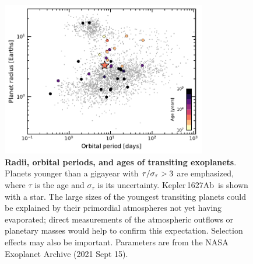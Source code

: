 \documentclass[12pt,modern,twocolumn,tighten]{aastex63}
\newcommand{\pn}{Kepler\,1627Ab} %
\begin{document}
\begin{figure}[tp]
	\begin{center}
		\leavevmode
		\includegraphics[width=0.8\textwidth]{f14.pdf}
	\end{center}
	\vspace{-0.7cm}
	\caption{
    {\bf Radii, orbital periods, and ages of transiting exoplanets}.
    Planets younger than a gigayear with ${\rm \tau}/\sigma_{\tau} >
    3$ are emphasized, where $\tau$ is the age and $\sigma_{\tau}$ is
    its uncertainty.  \pn\ is shown with a star.  The large sizes of
    the youngest transiting planets could be explained by their
    primordial atmospheres not yet having evaporated; direct
    measurements of the atmospheric outflows or planetary masses would
    help to confirm this expectation.  Selection effects may also be
    important.  Parameters are from the NASA Exoplanet Archive (2021
    Sept 15).
		\label{fig:rp_period_age}
	}
\end{figure}


\end{document}
